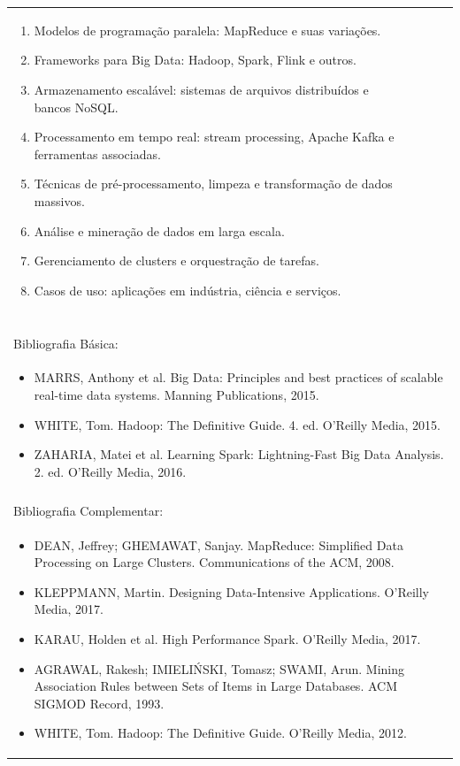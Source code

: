 \documentclass[11pt]{article}
\begin{document}
\begin{center}
\begin{longtable}{|p{4cm}|p{4cm}|p{4cm}|p{4cm}|}
{\begin{enumerate}
\item Modelos de programação paralela: MapReduce e suas variações.
\item Frameworks para Big Data: Hadoop, Spark, Flink e outros.
\item Armazenamento escalável: sistemas de arquivos distribuídos e bancos NoSQL.
\item Processamento em tempo real: stream processing, Apache Kafka e ferramentas associadas.
\item Técnicas de pré-processamento, limpeza e transformação de dados massivos.
\item Análise e mineração de dados em larga escala.
\item Gerenciamento de clusters e orquestração de tarefas.
\item Casos de uso: aplicações em indústria, ciência e serviços.\end{enumerate}}\\
\multicolumn{4}{|p{16cm}|}{}\\
\multicolumn{4}{|p{16cm}|}{}\\
\multicolumn{4}{|p{16cm}|}{\vspace{-1cm}}\\
\multicolumn{4}{|p{16cm}|}{}\\
\hline
\multicolumn{4}{|p{16cm}|}{Bibliografia Básica:}\\
\multicolumn{4}{|p{16cm}|}{%
\begin{itemize}\item MARRS, Anthony et al. Big Data: Principles and best practices of scalable real-time data systems. Manning Publications, 2015.
\item WHITE, Tom. Hadoop: The Definitive Guide. 4. ed. O'Reilly Media, 2015.
\item ZAHARIA, Matei et al. Learning Spark: Lightning-Fast Big Data Analysis. 2. ed. O'Reilly Media, 2016.\end{itemize}}\\
\multicolumn{4}{|p{16cm}|}{}\\
\hline
\multicolumn{4}{|p{16cm}|}{Bibliografia Complementar:}\\
\multicolumn{4}{|p{16cm}|}{%
\begin{itemize}\item DEAN, Jeffrey; GHEMAWAT, Sanjay. MapReduce: Simplified Data Processing on Large Clusters. Communications of the ACM, 2008.
\item KLEPPMANN, Martin. Designing Data-Intensive Applications. O'Reilly Media, 2017.
\item KARAU, Holden et al. High Performance Spark. O'Reilly Media, 2017.
\item AGRAWAL, Rakesh; IMIELIŃSKI, Tomasz; SWAMI, Arun. Mining Association Rules between Sets of Items in Large Databases. ACM SIGMOD Record, 1993.
\item WHITE, Tom. Hadoop: The Definitive Guide. O'Reilly Media, 2012.\end{itemize}}\\
\hline
\end{longtable}
\end{center}
\end{document}
